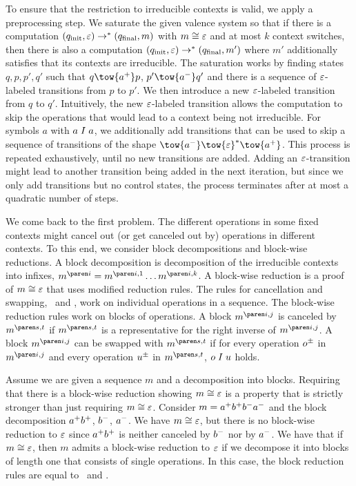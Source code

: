 \documentclass[../../diss.tex]{subfiles}
\begin{document}
To ensure that the restriction to irreducible contexts is valid, we apply a preprocessing step.
We saturate the given valence system so that if there is a computation $(q_{\text{init}},\varepsilon) \to^* (q_{\text{final}},m)$ with $m \cong \varepsilon$ and at most $k$ context switches, then there is also a computation $(q_{\text{init}},\varepsilon) \to^*(q_{\text{final}},m')$ where $m'$ additionally satisfies that its contexts are irreducible.
The saturation works by finding states $q,p,p',q'$ such that $q \tow{\inc{a}} p$, $p' \tow{\dec{a}} q'$ and there is a sequence of $\varepsilon$-labeled transitions from $p$ to $p'$.
We then introduce a new $\varepsilon$-labeled transition from $q$ to $q'$.
Intuitively, the new $\varepsilon$-labeled transition allows the computation to skip the operations that would lead to a context being not irreducible.
For symbols $a$ with $a \mathrel{I} a$, we additionally add transitions that can be used to skip a sequence of transitions of the shape $\tow{\dec{a}} \tow{\eps}^* \tow{\inc{a}}$.
This process is repeated exhaustively, until no new transitions are added.
Adding an $\varepsilon$-transition might lead to another transition being added in the next iteration, but since we only add transitions but no control states, the process terminates after at most a quadratic number of steps.

We come back to the first problem.
The different operations in some fixed contexts might cancel out (or get canceled out by) operations in different contexts.
To this end, we consider block decompositions and block-wise reductions.
A block decomposition is decomposition of the irreducible contexts into infixes, \eg $\itr{m}{i} = \itr{m}{i,1} \ldots \itr{m}{i,k}$.
A block-wise reduction is a proof of $m \cong \varepsilon$ that uses modified reduction rules.
The rules for cancellation and swapping, \RuleCancel~and \RuleSwap, work on individual operations in a sequence.
The block-wise reduction rules work on blocks of operations.
A block $\itr{m}{i,j}$ is canceled by $\itr{m}{s,t}$ if $\itr{m}{s,t}$ is a representative for the right inverse of $\itr{m}{i,j}$.
A block $\itr{m}{i,j}$ can be swapped with $\itr{m}{s,t}$ if for every operation ${o}^\pm$ in $\itr{m}{i,j}$ and every operation ${u}^\pm$ in $\itr{m}{s,t}$, $o \mathrel{I} u$ holds.

Assume we are given a sequence $m$ and a decomposition into blocks.
Requiring that there is a block-wise reduction showing $m \cong \varepsilon$ is a  property that is strictly stronger than just requiring $m \cong \varepsilon$.
Consider $m = {a}^+{b}^+{b}^-{a}^-$ and the block decomposition ${a}^+{b}^+$, ${b}^-$, ${a}^-$.
We have $m \cong \varepsilon$, but there is no block-wise reduction to $\varepsilon$ since ${a}^+{b}^+$ is neither canceled by ${b}^-$ nor by ${a}^-$.
We have that if $m \cong \varepsilon$, then $m$ admits a block-wise reduction to $\varepsilon$ if we decompose it into blocks of length one that consists of single operations.
In this case, the block reduction rules are equal to \RuleCancel~and \RuleSwap.
\end{document}
